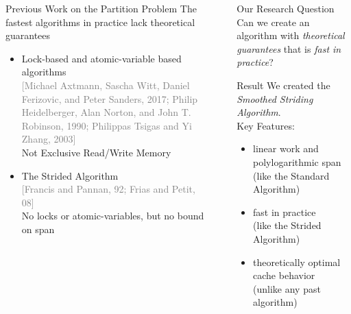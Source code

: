 \documentclass[table,serif,mathserif,final]{beamer}
\newcommand{\citefont}[1]{{\huge \textcolor{gray}{#1}}}
\theoremstyle{remark}
\begin{document}
\begin{frame}{}
\begin{columns}[t]
\begin{column}{0.43\linewidth}
\begin{block}{\Huge Previous Work on the Partition Problem}
  The {\color{blue}fastest algorithms in practice} {\color{red}lack theoretical guarantees}
	\begin{itemize}
		\item Lock-based and atomic-variable based algorithms\\ \citefont{[Michael Axtmann, Sascha Witt, Daniel Ferizovic, and Peter Sanders, 2017; Philip Heidelberger, Alan Norton, and John T. Robinson, 1990; Philippas Tsigas and Yi Zhang, 2003]}\\
      {\color{red} Not Exclusive Read/Write Memory}
		\item The Strided Algorithm\\ \citefont{[Francis and Pannan, 92; Frias and Petit, 08]}\\ 
      {\color{blue}No locks or atomic-variables,} {\color{red}but no bound on span}
	\end{itemize}
	\vspace{0.2cm}

\end{block}
  \end{column}

  \begin{column}{0.01\linewidth}
  \end{column}

  \begin{column}{0.5\linewidth}
\begin{block}{\Huge Our Research Question}
  \justifying
  \Huge Can we create an algorithm with \emph{theoretical guarantees} that is \emph{fast in practice}?
\end{block}

\begin{block}{\Huge Result}
  \justifying
  \Huge We created the \emph{Smoothed Striding Algorithm}. \\
  Key Features:
	\begin{itemize}
		\item linear work and polylogarithmic span \\
			{\color{blue} (like the Standard Algorithm)\\}
		\vspace{0.15cm}
		\item fast in practice \\
			{\color{blue} (like the Strided Algorithm)\\}
	\vspace{0.15cm}
		\item theoretically optimal cache behavior \\
			{\color{blue} (unlike any past algorithm)}
	\end{itemize}
\end{block}


\end{column}
\end{columns}
\end{frame}
\end{document}

